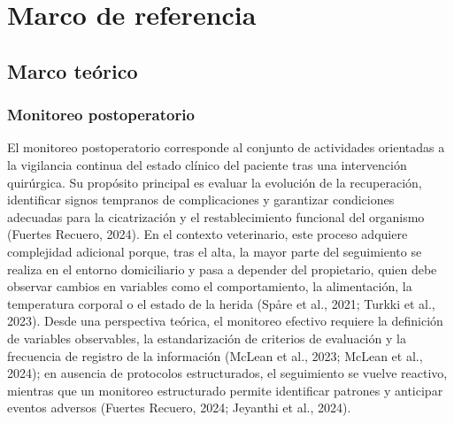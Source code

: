 \documentclass[stu, spanish]{apa7}
\begin{document}
\section{Marco de referencia}

\subsection{Marco te\'{o}rico}

\subsubsection{Monitoreo postoperatorio}
El monitoreo postoperatorio corresponde al conjunto de actividades orientadas a la vigilancia continua del estado cl\'{i}nico del paciente tras una intervenci\'{o}n quir\'{u}rgica. Su prop\'{o}sito principal es evaluar la evoluci\'{o}n de la recuperaci\'{o}n, identificar signos tempranos de complicaciones y garantizar condiciones adecuadas para la cicatrizaci\'{o}n y el restablecimiento funcional del organismo (Fuertes Recuero, 2024). En el contexto veterinario, este proceso adquiere complejidad adicional porque, tras el alta, la mayor parte del seguimiento se realiza en el entorno domiciliario y pasa a depender del propietario, quien debe observar cambios en variables como el comportamiento, la alimentaci\'{o}n, la temperatura corporal o el estado de la herida (Sp\r{a}re et al., 2021; Turkki et al., 2023). Desde una perspectiva te\'{o}rica, el monitoreo efectivo requiere la definici\'{o}n de variables observables, la estandarizaci\'{o}n de criterios de evaluaci\'{o}n y la frecuencia de registro de la informaci\'{o}n (McLean et al., 2023; McLean et al., 2024); en ausencia de protocolos estructurados, el seguimiento se vuelve reactivo, mientras que un monitoreo estructurado permite identificar patrones y anticipar eventos adversos (Fuertes Recuero, 2024; Jeyanthi et al., 2024).
\end{document}
